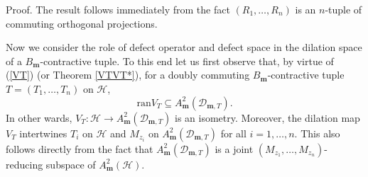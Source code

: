 \documentclass[12pt]{amsart}
\begin{document}
{\noindent}\textsf{Proof.} The result follows immediately from the fact
$(R_1, \ldots, R_n)$ is an $n$-tuple of commuting orthogonal
projections. {\hfill \vrule height6pt width 6pt depth 0pt}

Now we consider the role of defect operator and defect space in the
dilation space of a $B_{\bm{m}}$-contractive tuple. To this end let us
first observe that, by virtue of (\ref{VT}) (or Theorem
\ref{VTVT*}), for a doubly commuting $B_{\bm{m}}$-contractive tuple $T=
(T_1, \ldots, T_n)$ on ${\mathcal{H}}$, \[\mbox{ran} V_T \subseteq
A^2_{\bm{m}}({\mathcal{D}_{\bm{m},T}}).\]In other wards, $V_T : {\mathcal{H}} {\rightarrow} A^2_{\bm{m}}({\mathcal{D}_{\bm{m},T}})$ is
an isometry. Moreover,  the dilation map $V_T$ intertwines $T_i$ on
${\mathcal{H}}$ and $M_{z_i}$ on $A^2_{\bm{m}}({\mathcal{D}_{\bm{m},T}})$ for all $i = 1, \ldots, n$.
This also follows directly from the fact that $A^2_{\bm{m}}({\mathcal{D}_{\bm{m},T}})$ is a
joint $(M_{z_1}, \ldots, M_{z_n})$-reducing subspace of
$A^2_{\bm{m}}({\mathcal{H}})$.
\end{document}

